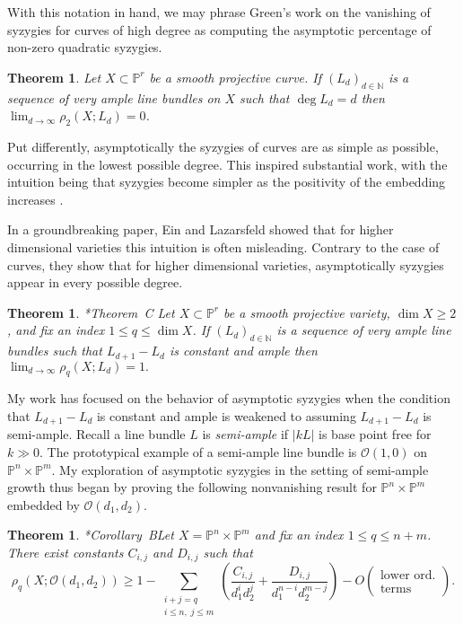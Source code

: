 \documentclass[11pt,reqno]{amsart}
\newtheorem{theorem}[lemma]{Theorem}
\theoremstyle{remark}
\renewcommand{\O}{\mathcal{O}}
\newcommand{\N}{\mathbb{N}}
\renewcommand{\P}{\mathbb{P}}
\begin{document}
With this notation in hand, we may phrase Green's work on the vanishing of syzygies for curves of high degree as computing the asymptotic percentage of non-zero quadratic syzygies. 

\begin{theorem}\cite{green84-I}
Let $X\subset \P^r$ be a smooth projective curve. If $(L_{d})_{d\in\N}$ is a sequence of very ample line bundles on $X$ such that $\deg L_{d} = d$ then $\lim_{d\to \infty} \rho_{2}\left(X;L_{d}\right) = 0$.
\end{theorem}

Put differently, asymptotically the syzygies of curves are as simple as possible, occurring in the lowest possible degree. This inspired substantial work, with the intuition being that syzygies become simpler as the positivity of the embedding increases \cite{ottavianiPaoletti01, einLazarsfeld93, lazarsfeldPareschiPopa11, pareschi00, pareschiPopa03, pareschiPopa04}.  

In a groundbreaking paper, Ein and Lazarsfeld showed that for higher dimensional varieties this intuition is often misleading. Contrary to the case of curves, they show that for higher dimensional varieties, asymptotically syzygies appear in every possible degree. 
  
\begin{theorem}\cite{einLazarsfeld12}*{Theorem~C}
Let $X\subset \P^r$ be a smooth projective variety, $\dim X \geq2$, and fix an index $1\leq q \leq \dim X$. If $(L_{d})_{d\in\N}$ is a sequence of very ample line bundles such that $L_{d+1}-L_{d}$ is constant and ample then $\lim_{d\to\infty} \rho_{q}\left(X; L_d\right) = 1.$
\end{theorem}

My work has focused on the behavior of asymptotic syzygies when the condition that $L_{d+1}-L_{d}$ is constant and ample is weakened to assuming $L_{d+1}-L_{d}$ is semi-ample. Recall a line bundle $L$ is \textit{semi-ample} if $|kL|$ is base point free for $k\gg0$. The prototypical example of a semi-ample line bundle is $\O(1,0)$ on $\P^{n}\times \P^{m}$. My exploration of asymptotic syzygies in the setting of semi-ample growth thus began by proving the following nonvanishing result for $\P^{n}\times\P^{m}$ embedded by $\O(d_{1},d_{2})$. 

\begin{theorem}\cite{bruce19-semiample}*{Corollary~B}\label{thm:bruce-semiample}
Let $X=\P^{n}\times\P^{m}$ and fix an index $1\leq q \leq n+m$. There exist constants $C_{i,j}$ and $D_{i,j}$ such that
\[
\rho_{q}\left(X; \O\left(d_1,d_2\right)\right)\geq1-\sum_{\substack{i+j=q \\  i \leq n, \; j \leq m}}\left(
\frac{C_{i,j}}{d_1^id_2^j}+\frac{D_{i,j}}{d_1^{n-i}d_2^{m-j}}\right)-O\left(\begin{matrix}\text{lower ord.}\\ \text{terms}\end{matrix}\right).
\]
\end{theorem}
\end{document}
